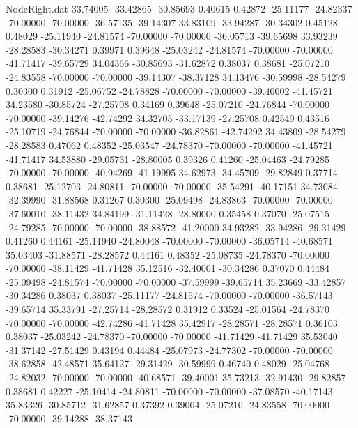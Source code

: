 \begin{filecontents}{NodeRight.dat}
  33.74005  -33.42865  -30.85693     0.40615    0.42872  -25.11177  -24.82337  -70.00000  -70.00000  -36.57135  -39.14307
  33.83109  -33.94287  -30.34302     0.45128    0.48029  -25.11940  -24.81574  -70.00000  -70.00000  -36.05713  -39.65698
  33.93239  -28.28583  -30.34271     0.39971    0.39648  -25.03242  -24.81574  -70.00000  -70.00000  -41.71417  -39.65729
  34.04366  -30.85693  -31.62872     0.38037    0.38681  -25.07210  -24.83558  -70.00000  -70.00000  -39.14307  -38.37128
  34.13476  -30.59998  -28.54279     0.30300    0.31912  -25.06752  -24.78828  -70.00000  -70.00000  -39.40002  -41.45721
  34.23580  -30.85724  -27.25708     0.34169    0.39648  -25.07210  -24.76844  -70.00000  -70.00000  -39.14276  -42.74292
  34.32705  -33.17139  -27.25708     0.42549    0.43516  -25.10719  -24.76844  -70.00000  -70.00000  -36.82861  -42.74292
  34.43809  -28.54279  -28.28583     0.47062    0.48352  -25.03547  -24.78370  -70.00000  -70.00000  -41.45721  -41.71417
  34.53880  -29.05731  -28.80005     0.39326    0.41260  -25.04463  -24.79285  -70.00000  -70.00000  -40.94269  -41.19995
  34.62973  -34.45709  -29.82849     0.37714    0.38681  -25.12703  -24.80811  -70.00000  -70.00000  -35.54291  -40.17151
  34.73084  -32.39990  -31.88568     0.31267    0.30300  -25.09498  -24.83863  -70.00000  -70.00000  -37.60010  -38.11432
  34.84199  -31.11428  -28.80000     0.35458    0.37070  -25.07515  -24.79285  -70.00000  -70.00000  -38.88572  -41.20000
  34.93282  -33.94286  -29.31429     0.41260    0.44161  -25.11940  -24.80048  -70.00000  -70.00000  -36.05714  -40.68571
  35.03403  -31.88571  -28.28572     0.44161    0.48352  -25.08735  -24.78370  -70.00000  -70.00000  -38.11429  -41.71428
  35.12516  -32.40001  -30.34286     0.37070    0.44484  -25.09498  -24.81574  -70.00000  -70.00000  -37.59999  -39.65714
  35.23669  -33.42857  -30.34286     0.38037    0.38037  -25.11177  -24.81574  -70.00000  -70.00000  -36.57143  -39.65714
  35.33791  -27.25714  -28.28572     0.31912    0.33524  -25.01564  -24.78370  -70.00000  -70.00000  -42.74286  -41.71428
  35.42917  -28.28571  -28.28571     0.36103    0.38037  -25.03242  -24.78370  -70.00000  -70.00000  -41.71429  -41.71429
  35.53040  -31.37142  -27.51429     0.43194    0.44484  -25.07973  -24.77302  -70.00000  -70.00000  -38.62858  -42.48571
  35.64127  -29.31429  -30.59999     0.46740    0.48029  -25.04768  -24.82032  -70.00000  -70.00000  -40.68571  -39.40001
  35.73213  -32.91430  -29.82857     0.38681    0.42227  -25.10414  -24.80811  -70.00000  -70.00000  -37.08570  -40.17143
  35.83326  -30.85712  -31.62857     0.37392    0.39004  -25.07210  -24.83558  -70.00000  -70.00000  -39.14288  -38.37143

\end{filecontents}
